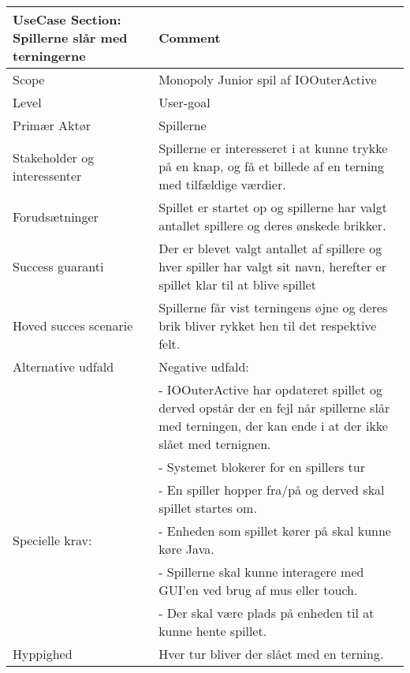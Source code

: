 \begin{center}
\begin{tabular}{ | m{10em} | m{10cm}| }
        \hline
            UseCase Section: Spillerne slår med terningerne & Comment\\
        \hline
            Scope & Monopoly Junior spil af IOOuterActive\\
        \hline
            Level & User-goal\\
        \hline
            Primær Aktør & Spillerne\\
        \hline
            Stakeholder og interessenter & Spillerne er interesseret i at kunne trykke på en knap, og få et billede af en terning med tilfældige værdier.\\
        \hline
            Forudsætninger & Spillet er startet op og spillerne har valgt antallet spillere og deres ønskede brikker.\\
        \hline
            Success guaranti & Der er blevet valgt antallet af spillere og hver spiller har valgt sit navn, herefter er spillet klar til at blive spillet\\
        \hline
            Hoved succes scenarie & Spillerne får vist terningens øjne og deres brik bliver rykket hen til det respektive felt.\\
        \hline
            Alternative udfald & Negative udfald:\\
                & -	IOOuterActive har opdateret spillet og derved opstår der en fejl når spillerne slår med terningen, der kan ende i at der ikke slået med ternignen.\\
                & -	Systemet blokerer for en spillers tur\\
                & -	En spiller hopper fra/på og derved skal spillet startes om.\\
        \hline
            Specielle krav:
            & -	Enheden som spillet kører på skal kunne køre Java.\\
            & -	Spillerne skal kunne interagere med GUI’en ved brug af mus eller touch.\\
            & -	Der skal være plads på enheden til at kunne hente spillet.\\
        \hline
            Hyppighed & Hver tur bliver der slået med en terning.\\
        \hline
    \end{tabular}
\end{center}
